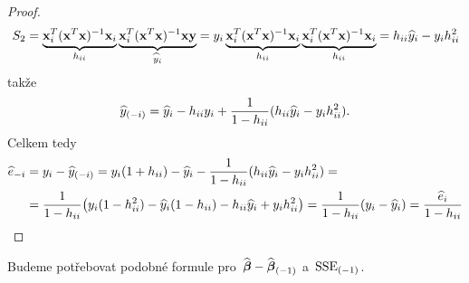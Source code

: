 \begin{proof}
	$$ S_2=\underbrace{\textbf{x}_i^T(\textbf{x}^T\textbf{x})^{-1}\textbf{x}_i}_{h_{ii}}\underbrace{\textbf{x}_i^T(\textbf{x}^T\textbf{x})^{-1}\textbf{x}\textbf{y}}_{\widehat{y}_i}=y_i\underbrace{\textbf{x}_i^T(\textbf{x}^T\textbf{x})^{-1}\textbf{x}_i}_{h_{ii}}\underbrace{\textbf{x}_i^T(\textbf{x}^T\textbf{x})^{-1}\textbf{x}_i}_{h_{ii}}=h_{ii}\widehat{y}_i-y_ih_{ii}^2 $$
takže 
$$ \widehat{y}_{(-i)}=\widehat{y}_i-h_{ii}y_i+\frac{1}{1-h_{ii}}(h_{ii}\widehat{y}_i-y_ih_{ii}^2).$$
Celkem tedy 
\[
\begin{split}
\widehat{e}_{-i}&=y_i-\widehat{y}_{(-i)}=y_i(1+h_{ii})-\widehat{y}_i-\frac{1}{1-h_{ii}}(h_{ii}\widehat{y}_i-y_ih_{ii}^2)=\\&=\frac{1}{1-h_{ii}}\big(y_i(1-h_{ii}^2)-\widehat{y}_i(1-h_{ii})-h_{ii}\widehat{y}_i+y_ih_{ii}^2\big)=\frac{1}{1-h_{ii}}(y_i-\widehat{y}_i)=\frac{\widehat{e}_i}{1-h_{ii}}
\end{split}
\]
\end{proof}

Budeme potřebovat podobné formule pro~$\widehat{\boldsymbol{\beta}}-\widehat{\boldsymbol{\beta}}_{(-1)}$ a~${\mathrm{SSE}_{(-1)}}$.

